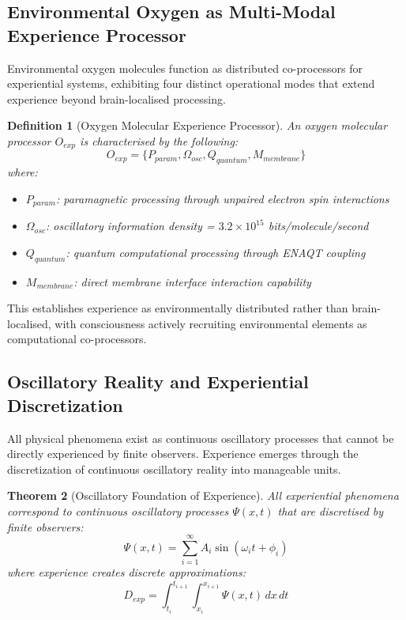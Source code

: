 \documentclass{article}
\newtheorem{theorem}{Theorem}[section]
\newtheorem{definition}[theorem]{Definition}
\begin{document}
\subsection{Environmental Oxygen as Multi-Modal Experience Processor}

Environmental oxygen molecules function as distributed co-processors for experiential systems, exhibiting four distinct operational modes that extend experience beyond brain-localised processing.

\begin{definition}[Oxygen Molecular Experience Processor]
An oxygen molecular processor $O_{exp}$ is characterised by the following:
$$O_{exp} = \{P_{param}, \Omega_{osc}, Q_{quantum}, M_{membrane}\}$$
where:
\begin{itemize}
\item $P_{param}$: paramagnetic processing through unpaired electron spin interactions
\item $\Omega_{osc}$: oscillatory information density = $3.2 \times 10^{15}$ bits/molecule/second
\item $Q_{quantum}$: quantum computational processing through ENAQT coupling
\item $M_{membrane}$: direct membrane interface interaction capability
\end{itemize}
\end{definition}

This establishes experience as environmentally distributed rather than brain-localised, with consciousness actively recruiting environmental elements as computational co-processors.

\subsection{Oscillatory Reality and Experiential Discretization}

All physical phenomena exist as continuous oscillatory processes that cannot be directly experienced by finite observers. Experience emerges through the discretization of continuous oscillatory reality into manageable units.

\begin{theorem}[Oscillatory Foundation of Experience]
All experiential phenomena correspond to continuous oscillatory processes $\Psi(x,t)$ that are discretised by finite observers:
$$\Psi(x,t) = \sum_{i=1}^{\infty} A_i \sin(\omega_i t + \phi_i)$$
where experience creates discrete approximations:
$$D_{exp} = \int_{t_i}^{t_{i+1}} \int_{x_i}^{x_{i+1}} \Psi(x,t) \, dx \, dt$$
\end{theorem}
\end{document}

